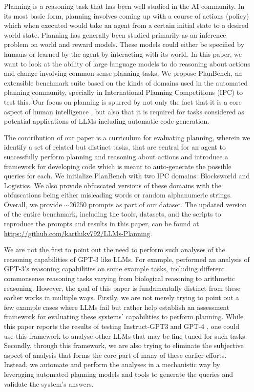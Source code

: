 Planning is a reasoning task that has been well studied in the AI community. In its most basic form, planning involves coming up with a course of actions (policy) which when executed would take an agent from a certain initial state to a desired world state. 
Planning has generally been studied primarily as an inference problem on world and reward models. These models could either be specified by humans or learned by the agent by interacting with its world.
In this paper, we want to look at the ability of large language models to do reasoning about actions and change involving common-sense planning tasks. We propose PlanBench, an extensible benchmark suite based on the kinds of domains used in the automated planning community, specially in International Planning Competitions (IPC) \cite{ipc} to test this.
Our focus on planning is spurred by not only the fact that it is a core aspect of human intelligence \cite{russell2010artificial}, but also that it is required for tasks considered as potential applications of LLMs including automatic code generation.  

The contribution of our paper is a curriculum for evaluating planning, wherein we identify a set of related but distinct tasks, that are central for an agent to successfully perform planning and reasoning about actions and introduce a framework for developing code which is meant to auto-generate the possible queries for each. We initialize PlanBench with two IPC domains: Blocksworld and Logistics. We also provide obfuscated versions of these domains with the obfuscations being either misleading words or random alphanumeric strings. Overall, we provide $\sim$26250 prompts as part of our dataset.  The updated version of the entire benchmark, including the tools, datasets, and the scripts to reproduce the prompts and results in this paper, can be found at \url{https://github.com/karthikv792/LLMs-Planning}.

We are not the first to point out the need to perform such analyses of the reasoning capabilities of GPT-3 like LLMs. For example, \cite{blov-exp} performed an analysis of GPT-3's reasoning capabilities on some example tasks, including different commonsense reasoning tasks varying from biological reasoning to arithmetic reasoning. However, the goal of this paper is fundamentally distinct from these earlier works in multiple ways. Firstly, we are not merely trying to point out a few example cases where LLMs fail but rather help establish an assessment framework for evaluating these systems' capabilities to perform planning. While this paper reports the results of testing Instruct-GPT3 \cite{ouyang2022training} and GPT-4 \cite{openai2023gpt4}, one could use this framework to analyse other LLMs that may be fine-tuned for such tasks. Secondly, through this framework, we are also trying to eliminate the subjective aspect of analysis that forms the core part of many of these earlier efforts. Instead, we automate and perform the analyses in a mechanistic way by leveraging automated planning models and tools to generate the queries and validate the system's answers. 

